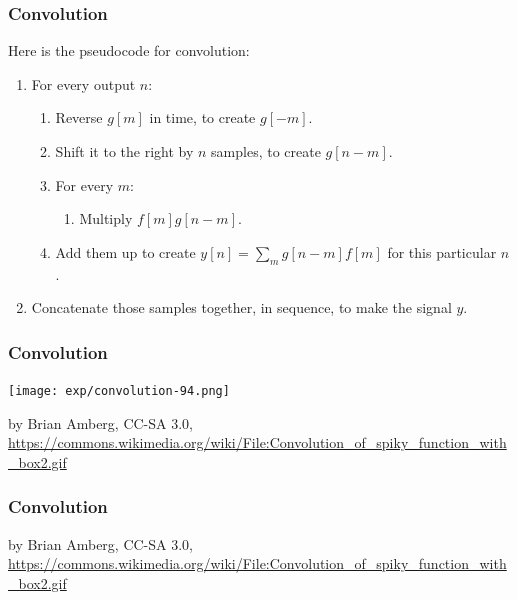 \documentclass{beamer}
\begin{document}
\begin{frame}
  \frametitle{Convolution}
  \centerline{}

  \vspace*{2mm}
  
  Here is the pseudocode for convolution:
  \begin{enumerate}
  \item For every output $n$:
    \begin{enumerate}
    \item Reverse $g[m]$ in time, to create $g[-m]$.
    \item Shift it to the right by $n$ samples, to create $g[n-m]$.
    \item For every $m$:
      \begin{enumerate}
      \item Multiply $f[m]g[n-m]$.
      \end{enumerate}
    \item Add them up to create $y[n] = \sum_m g[n-m] f[m]$ for this particular $n$.
    \end{enumerate}
    \item Concatenate those samples together, in sequence, to make the signal $y$.
  \end{enumerate}
\end{frame}

\begin{frame}
  \frametitle{Convolution}
  \centerline{\texttt{[image: exp/convolution-94.png]}}
  \begin{tiny}
    by Brian Amberg, CC-SA 3.0,
    \url{https://commons.wikimedia.org/wiki/File:Convolution_of_spiky_function_with_box2.gif}
  \end{tiny}
\end{frame}

\begin{frame}
  \frametitle{Convolution}
  \begin{tiny}
    by Brian Amberg, CC-SA 3.0,
    \url{https://commons.wikimedia.org/wiki/File:Convolution_of_spiky_function_with_box2.gif}
  \end{tiny}
\end{frame}
\end{document}
